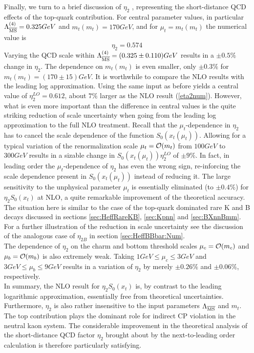 Finally, we turn to a brief discussion of $\eta_2$ \cite{burasjaminweisz:90},
representing the short-distance QCD effects of the top-quark
contribution. For central parameter values, in particular
$\Lambda_{\overline{\rm MS}}^{(4)}=0.325 GeV$ and $m_t(m_t)=170 GeV$, and for $\mu_t=m_t(m_t)$
the numerical value is
\begin{equation}\label{eta2num}
\eta_2=0.574
\end{equation}
Varying the QCD scale within
$\Lambda_{\overline{\rm MS}}^{(4)}=(0.325\pm 0.110) GeV$ results in a
$\pm 0.5\%$ change in $\eta_2$. The dependence on $m_t(m_t)$ is even
smaller, only $\pm 0.3\%$ for $m_t(m_t)=(170\pm 15)GeV$.
It is worthwhile to compare the NLO results with the leading log
approximation. Using the same input as before yields a central value of
$\eta^{LO}_2=0.612$, about $7\%$ larger as the NLO result (\ref{eta2num}).
However, what is even more important than the difference in central
values is the quite striking reduction of scale uncertainty when going
from the leading log approximation to the full NLO treatment.
Recall that the $\mu_t$-dependence in $\eta_2$ has to cancel the
scale dependence of the function $S_0(x_t(\mu_t))$. Allowing for a
typical variation of the renormalization scale $\mu_t={\cal O}(m_t)$
from $100 GeV$ to $300 GeV$ results in a sizable change in
$S_0(x_t(\mu_t)) \eta^{LO}_2$ of $\pm 9\%$. In fact, in leading order
the $\mu_t$-dependence of $\eta_2$ has even the wrong sign, re-inforcing
the scale dependence present in $S_0(x_t(\mu_t))$ instead of
reducing it. The large sensitivity to the unphysical parameter $\mu_t$
is essentially eliminated (to $\pm 0.4\%$) for $\eta_2 S_0(x_t)$ at
NLO, a quite remarkable improvement of the theoretical accuracy. The
situation here is similar to the case of the top-quark dominated
rare K and B decays discussed in sections
\ref{sec:HeffRareKB}, \ref{sec:Kpnn} and \ref{sec:BXnnBmm}.
For a further illustration of the reduction in scale uncertainty see
the discussion of the analogous case of $\eta_{2B}$ in section
\ref{sec:HeffBBbar:Num}.
\\
The dependence of $\eta_2$ on the charm and bottom threshold scales
$\mu_c={\cal O}(m_c)$ and  $\mu_b={\cal O}(m_b)$ is also extremely
weak. Taking $1GeV\leq\mu_c\leq 3GeV$ and $3GeV\leq\mu_b\leq 9GeV$
results in a variation of $\eta_2$ by merely $\pm 0.26\%$ and
$\pm 0.06\%$, respectively.
\\
In summary, the NLO result for $\eta_2 S_0(x_t)$ is, by contrast to the
leading logarithmic approximation, essentially free from theoretical
uncertainties. Furthermore, $\eta_2$ is also rather insensitive to the
input parameters $\Lambda_{\overline{\rm MS}}$ and $m_t$. The top
contribution plays the dominant role for indirect CP violation in the
neutral kaon system. The considerable improvement in the theoretical
analysis of the short-distance QCD factor $\eta_2$ brought about by
the next-to-leading order calculation is therefore particularly
satisfying.
